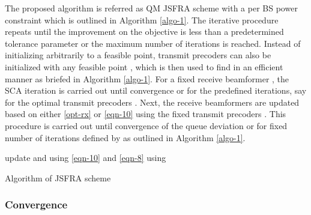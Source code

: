 The proposed algorithm is referred as \acl{QM} \ac{JSFRA} scheme with a per \ac{BS} power constraint which is outlined in Algorithm \ref{algo-1}. The iterative procedure repeats until the improvement on the objective is less than a predetermined tolerance parameter or the maximum number of iterations is reached. Instead of initializing  arbitrarily to a feasible point, transmit precoders can also be initialized with any feasible point , which is then used to find  in an efficient manner as briefed in Algorithm \ref{algo-1}. For a fixed receive beamformer , the \ac{SCA} iteration is carried out until convergence or for the predefined iterations, say  for the optimal transmit precoders . Next, the receive beamformers are updated based on either \eqref{opt-rx} or \eqref{eqn-10} using the fixed transmit precoders . This procedure is carried out until convergence of the queue deviation or for fixed number of iterations defined by  as outlined in Algorithm \ref{algo-1}.
\begin{algorithm}
 \SetAlgoLined
 \DontPrintSemicolon
 \BlankLine
 update  and  using \eqref{eqn-10} and \eqref{eqn-8} using \;
 \caption{Algorithm of \acs{JSFRA} scheme}
 \label{algo-1}
\end{algorithm}

\subsubsection*{Convergence}

